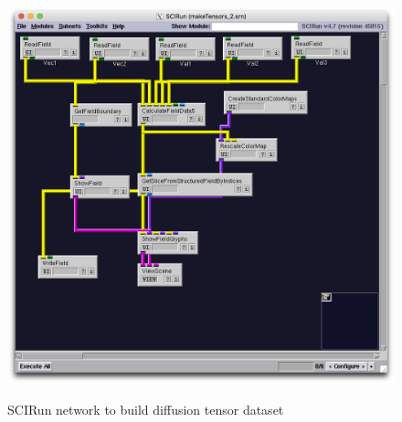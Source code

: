 \begin{figure}[p]
\begin{center}
\includegraphics[width=\textwidth]{Figures/make_DTI.png}\\
\caption{SCIRun network to build diffusion tensor dataset}
\label{fig:maketensornet}
\end{center}
\end{figure}

